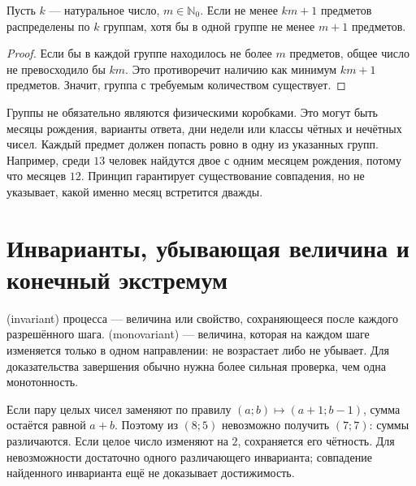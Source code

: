 \begin{theorem}\label{thm:legacy-c17-5}
Пусть \(k\) — натуральное число, \(m\in\mathbb N_0\). Если не менее \(km+1\) предметов распределены по \(k\) группам, хотя бы в одной группе не менее \(m+1\) предметов.
\end{theorem}
\begin{proof}
Если бы в каждой группе находилось не более \(m\) предметов, общее число не превосходило бы \(km\). Это противоречит наличию как минимум \(km+1\) предметов. Значит, группа с требуемым количеством существует.
\end{proof}
Группы не обязательно являются физическими коробками. Это могут быть месяцы рождения, варианты ответа, дни недели или классы чётных и нечётных чисел. Каждый предмет должен попасть ровно в одну из указанных групп. Например, среди \(13\) человек найдутся двое с одним месяцем рождения, потому что месяцев \(12\). Принцип гарантирует существование совпадения, но не указывает, какой именно месяц встретится дважды.

\section{Инварианты, убывающая величина и конечный экстремум}
\begin{definition}
 (invariant) процесса — величина или свойство, сохраняющееся после каждого разрешённого шага.  (monovariant) — величина, которая на каждом шаге изменяется только в одном направлении: не возрастает либо не убывает. Для доказательства завершения обычно нужна более сильная проверка, чем одна монотонность.
\end{definition}
Если пару целых чисел заменяют по правилу \((a;b)\mapsto(a+1;b-1)\), сумма остаётся равной \(a+b\). Поэтому из \((8;5)\) невозможно получить \((7;7)\): суммы различаются. Если целое число изменяют на \(2\), сохраняется его чётность. Для невозможности достаточно одного различающего инварианта; совпадение найденного инварианта ещё не доказывает достижимость.

